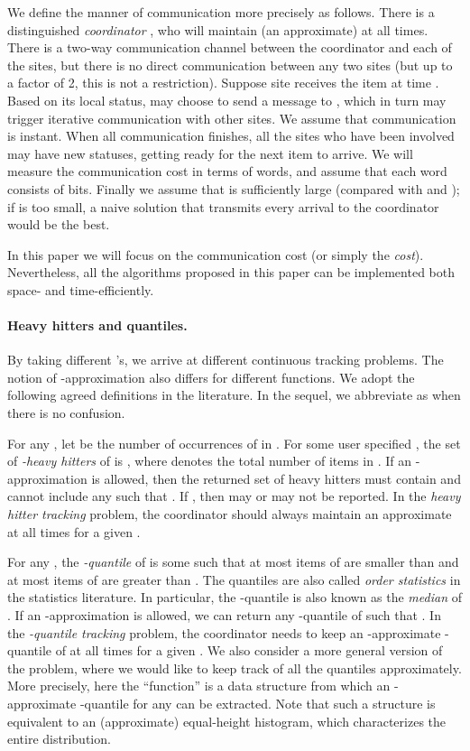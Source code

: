 \documentclass[10pt]{article}
\begin{document}
We define the manner of communication more precisely as follows.  There is
a distinguished {\em coordinator} , who will maintain (an approximate)
 at all times.  There is a two-way communication channel between the
coordinator and each of the  sites, but there is no direct communication
between any two sites (but up to a factor of 2, this is not a restriction).
Suppose site  receives the item  at time .  Based on its
local status,  may choose to send a message to , which in turn may
trigger iterative communication with other sites.  We assume that
communication is instant.  When all communication finishes, all the sites
who have been involved may have new statuses, getting ready for the next
item  to arrive.  We will measure the communication cost in terms
of words, and assume that each word consists of  bits.  Finally we assume that  is sufficiently large
(compared with  and ); if  is too small, a naive solution
that transmits every arrival to the coordinator would be the best.

In this paper we will focus on the communication cost (or simply the {\em
  cost}).  Nevertheless, all the algorithms proposed in this paper can be
implemented both space- and time-efficiently.

\paragraph{Heavy hitters and quantiles.}
By taking different 's, we arrive at different continuous tracking
problems.  The notion of -approximation also differs for different
functions.  We adopt the following agreed definitions in the literature.
In the sequel, we abbreviate  as  when there is no confusion.

For any , let  be the number of occurrences of  in .
For some user specified , the set of {\em -heavy
  hitters} of  is , where  denotes the total number of items in .  If an
-approximation is allowed, then the returned set of heavy hitters
must contain  and cannot include any  such that
.  If , then
 may or may not be reported.  In the {\em heavy hitter tracking}
problem, the coordinator should always maintain an approximate
 at all times for a given .

For any , the {\em -quantile} of  is some  such that at most  items of  are smaller than  and at
most  items of  are greater than .  The quantiles are
also called {\em order statistics} in the statistics literature.  In
particular, the -quantile is also known as the {\em median} of
.  If an -approximation is allowed, we can return any
-quantile of  such that .
In the {\em -quantile tracking} problem, the coordinator needs to
keep an -approximate -quantile of  at all times for a given
.  We also consider a more general version of the problem, where we
would like to keep track of all the quantiles approximately.  More
precisely, here the ``function''  is a data structure from which an
-approximate -quantile for any  can be extracted.  Note
that such a structure is equivalent to an (approximate) equal-height
histogram, which characterizes the entire distribution.
\end{document}

